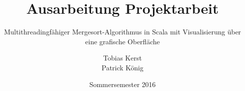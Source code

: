 \documentclass[a4paper,titlepage,12pt]{scrreprt}
\begin{document}
\titlehead{
	\texttt{[image: hska\_logo]}
}

\title{Ausarbeitung Projektarbeit}
\subtitle{Multithreadingfähiger Mergesort-Algorithmus in Scala mit Visualisierung über eine grafische Oberfläche}
\author{%
	Tobias Kerst \\
	Patrick König
}
\date{Sommersemester 2016}
\publishers{
    \textbf{Dozent:} Prof. Dr. Heiko Körner
}
\maketitle

\clearpage

\begingroup
\hypersetup{linkcolor=black}
\tableofcontents
\endgroup

\clearpage


\clearpage


\clearpage


\clearpage


\clearpage


\clearpage


\clearpage



\clearpage

\listoffigures
\end{document}
